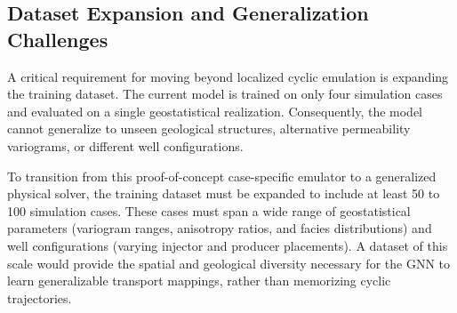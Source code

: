 \documentclass[10pt,twocolumn]{article}
\begin{document}
\subsection{Dataset Expansion and Generalization Challenges}
A critical requirement for moving beyond localized cyclic emulation is expanding the training dataset. The current model is trained on only four simulation cases and evaluated on a single geostatistical realization. Consequently, the model cannot generalize to unseen geological structures, alternative permeability variograms, or different well configurations. 

To transition from this proof-of-concept case-specific emulator to a generalized physical solver, the training dataset must be expanded to include at least 50 to 100 simulation cases. These cases must span a wide range of geostatistical parameters (variogram ranges, anisotropy ratios, and facies distributions) and well configurations (varying injector and producer placements). A dataset of this scale would provide the spatial and geological diversity necessary for the GNN to learn generalizable transport mappings, rather than memorizing cyclic trajectories.

\end{document}
